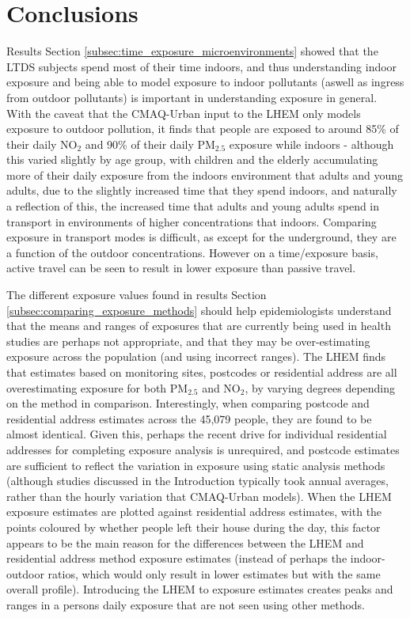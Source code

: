 \section{Conclusions}
\label{sec:2conclusions}


Results Section \ref{subsec:time_exposure_microenvironments} showed that the LTDS subjects spend most of their time indoors, and thus understanding indoor exposure and being able to model exposure to indoor pollutants (aswell as ingress from outdoor pollutants) is important in understanding exposure in general. With the caveat that the CMAQ-Urban input to the LHEM only models exposure to outdoor pollution, it finds that people are exposed to around 85\% of their daily NO$_{2}$ and 90\% of their daily PM$_{2.5}$ exposure while indoors - although this varied slightly by age group, with children and the elderly accumulating more of their daily exposure from the indoors environment that adults and young adults, due to the slightly increased time that they spend indoors, and naturally a reflection of this, the increased time that adults and young adults spend in transport in environments of higher concentrations that indoors. Comparing exposure in transport modes is difficult, as except for the underground, they are a function of the outdoor concentrations. However on a time/exposure basis, active travel can be seen to result in lower exposure than passive travel.


The different exposure values found in results Section \ref{subsec:comparing_exposure_methods} should help epidemiologists understand that the means and ranges of exposures that are currently being used in health studies are perhaps not appropriate, and that they may be over-estimating exposure across the population (and using incorrect ranges). The LHEM finds that estimates based on monitoring sites, postcodes or residential address are all overestimating exposure for both PM$_{2.5}$ and NO$_{2}$, by varying degrees depending on the method in comparison. Interestingly, when comparing postcode and residential address estimates across the 45,079 people, they are found to be almost identical. Given this, perhaps the recent drive for individual residential addresses for completing exposure analysis is unrequired, and postcode estimates are sufficient to reflect the variation in exposure using static analysis methods (although studies discussed in the Introduction typically took annual averages, rather than the hourly variation that CMAQ-Urban models). When the LHEM exposure estimates are plotted against residential address estimates, with the points coloured by whether people left their house during the day, this factor appears to be the main reason for the differences between the LHEM and residential address method exposure estimates (instead of perhaps the indoor-outdoor ratios, which would only result in lower estimates but with the same overall profile). Introducing the LHEM to exposure estimates creates peaks and ranges in a persons daily exposure that are not seen using other methods.

